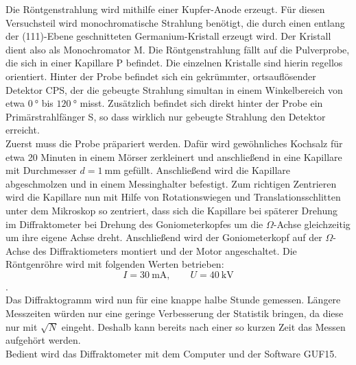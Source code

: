 Die Röntgenstrahlung wird mithilfe einer Kupfer-Anode erzeugt. Für diesen Versuchsteil wird monochromatische Strahlung benötigt, die durch einen entlang der (111)-Ebene geschnitteten Germanium-Kristall erzeugt wird. Der Kristall dient also als Monochromator M. Die Röntgenstrahlung fällt auf die Pulverprobe, die sich in einer Kapillare P befindet. Die einzelnen Kristalle sind hierin regellos orientiert. Hinter der Probe befindet sich ein gekrümmter, ortsauflösender Detektor CPS, der die gebeugte Strahlung simultan in einem Winkelbereich von etwa $\SI{0}{\degree}$ bis $\SI{120}{\degree}$ misst. Zusätzlich befindet sich direkt hinter der Probe ein Primärstrahlfänger S, so dass wirklich nur gebeugte Strahlung den Detektor erreicht.\\
Zuerst muss die Probe präpariert werden. Dafür wird gewöhnliches Kochsalz für etwa 20 Minuten in einem Mörser zerkleinert und anschließend in eine Kapillare mit Durchmesser $d = \SI{1}{\milli\metre}$ gefüllt. Anschließend wird die Kapillare abgeschmolzen und in einem Messinghalter befestigt. Zum richtigen Zentrieren wird die Kapillare nun mit Hilfe von Rotationswiegen und Translationsschlitten unter dem Mikroskop so zentriert, dass sich die Kapillare bei späterer Drehung im Diffraktometer bei Drehung des Goniometerkopfes um die $\Omega$-Achse gleichzeitig um ihre eigene Achse dreht. Anschließend wird der Goniometerkopf auf der $\Omega$-Achse des Diffraktiometers montiert und der Motor angeschaltet. Die Röntgenröhre wird mit folgenden Werten betrieben:
\begin{equation}
    I = \SI[]{30}[]{\milli\ampere}, \qquad U = \SI[]{40}[]{\kilo\volt}
\end{equation}.\\
Das Diffraktogramm wird nun für eine knappe halbe Stunde gemessen. Längere Messzeiten würden nur eine geringe Verbesserung der Statistik bringen, da diese nur mit $\sqrt{N}$ eingeht. Deshalb kann bereits nach einer so kurzen Zeit das Messen aufgehört werden.\\
Bedient wird das Diffraktometer mit dem Computer und der Software GUF15. 